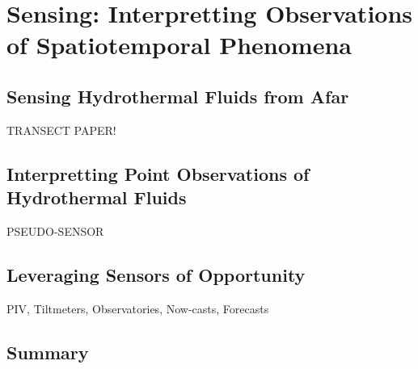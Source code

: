\chapter{Sensing: Interpretting Observations of Spatiotemporal Phenomena}

\section{Sensing Hydrothermal Fluids from Afar}
TRANSECT PAPER!

\section{Interpretting Point Observations of Hydrothermal Fluids}
PSEUDO-SENSOR

\section{Leveraging Sensors of Opportunity}
PIV, Tiltmeters, Observatories, Now-casts, Forecasts

\section{Summary}
